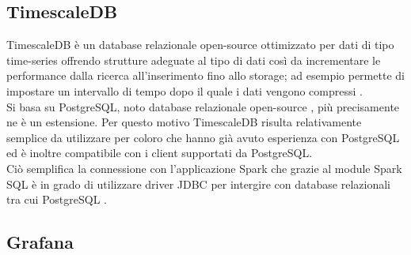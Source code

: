 \subsection{TimescaleDB}

TimescaleDB è un database relazionale open-source ottimizzato per dati di tipo time-series
offrendo strutture adeguate al tipo di dati così da incrementare le performance dalla ricerca
all'inserimento fino allo storage; ad esempio permette di impostare un intervallo di tempo
dopo il quale i dati vengono compressi \cite{timescale}.
\\
Si basa su PostgreSQL, noto database relazionale open-source \cite{postgresql}, più precisamente
ne è un estensione. Per questo motivo TimescaleDB risulta relativamente semplice da utilizzare
per coloro che hanno già avuto esperienza con PostgreSQL ed è inoltre compatibile con i client
supportati da PostgreSQL.
\\
Ciò semplifica la connessione con l'applicazione Spark che grazie al module Spark SQL è in grado
di utilizzare driver JDBC per intergire con database relazionali tra cui PostgreSQL
\cite{spark_sql}.

\subsection{Grafana}

